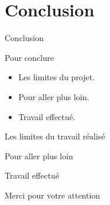 \section{Conclusion}

\begin{frame}{Conclusion}
  \begin{block}{Pour conclure}
    \begin{itemize}
    \item Les limites du projet.
    \item Pour aller plus loin.
    \item Travail effectué.
    \end{itemize}
  \end{block}
\end{frame}

\begin{frame}{Les limites du travail réalisé}  
\end{frame}

\begin{frame}{Pour aller plus loin}
\end{frame}

\begin{frame}{Travail effectué}  
\end{frame}

\begin{frame}{Merci pour votre attention}
  \tableofcontents
\end{frame}
